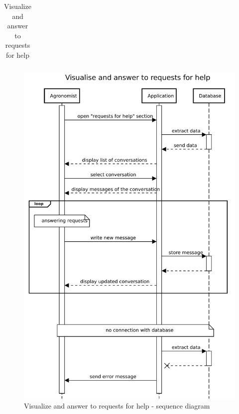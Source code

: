 \begin{table}[H]
\begin{tabular}[c]{|l|p{}|}
    \end{tabular}
    \caption{\label{tab:help_request_section_access}Visualize and answer to requests for help}
\end{table}

\begin{figure}[H]
    \centering
    \includegraphics[scale=0.75]{Images/Sequence diagrams/Agronomist - visualise and answer requests for help.pdf}
    \caption{Visualize and answer to requests for help - sequence diagram}
    \label{fig:my_label}
\end{figure}


